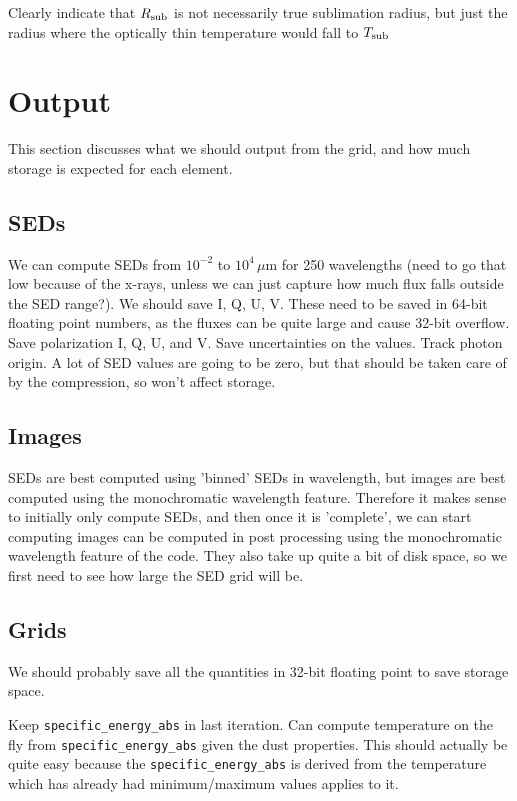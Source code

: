 \documentclass[10pt]{article}
\begin{document}
Clearly indicate that $R_{\rm sub}$ is not necessarily true sublimation radius, but just the radius where the optically thin temperature would fall to $T_{\rm sub}$

\section{Output}

This section discusses what we should output from the grid, and how much storage is expected for each element.

\subsection{SEDs}

We can compute SEDs from $10^{-2}$ to $10^4$\,$\mu$m for 250 wavelengths (need to go that low because of the x-rays, unless we can just capture how much flux falls outside the SED range?). We should save I, Q, U, V. These need to be saved in 64-bit floating point numbers, as the fluxes can be quite large and cause 32-bit overflow. Save polarization I, Q, U, and V. Save uncertainties on the values. Track photon origin. A lot of SED values are going to be zero, but that should be taken care of by the compression, so won't affect storage.

\subsection{Images}

SEDs are best computed using 'binned' SEDs in wavelength, but images are best computed using the monochromatic wavelength feature. Therefore it makes sense to initially only compute SEDs, and then once it is 'complete', we can start computing images can be computed in post processing using the monochromatic wavelength feature of the code. They also take up quite a bit of disk space, so we first need to see how large the SED grid will be.

\subsection{Grids}

We should probably save all the quantities in 32-bit floating point to save storage space.

Keep \texttt{specific\_energy\_abs} in last iteration. Can compute temperature on the fly from \texttt{\texttt{specific\_energy\_abs}} given the dust properties. This should actually be quite easy because the \texttt{specific\_energy\_abs} is derived from the temperature which has already had minimum/maximum values applies to it.
\end{document}
